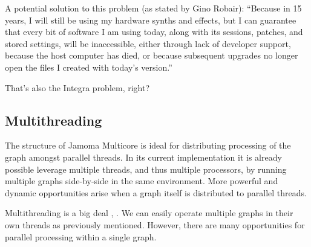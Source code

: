 \documentclass[twoside,a4paper]{article}
\begin{document}
A potential solution to this problem (as stated by Gino Robair):
``Because in 15 years, I will still be using my hardware synths and effects,
but I can guarantee that every bit of software I am using today, along with its sessions,
patches,
and stored settings,
will be inaccessible,
either through lack of developer support, because the host computer has died, 
or because subsequent upgrades no longer open the files I created with today's version.''

That's also the Integra problem, right?





\subsection{Multithreading} %

The structure of Jamoma Multicore is ideal for distributing processing of the graph amongst parallel threads.  In its current implementation it is already possible leverage multiple threads, and thus multiple processors, by running multiple graphs side-by-side in the same environment.  More powerful and dynamic opportunities arise when a graph itself is distributed to parallel threads.

%   











Multithreading is a big deal \cite{asanovic2008parallel}, \cite{multicoreICMC08}.  We can easily operate multiple graphs in their own threads as previously mentioned.  However, there are many opportunities for parallel processing within a single graph.
\end{document}
